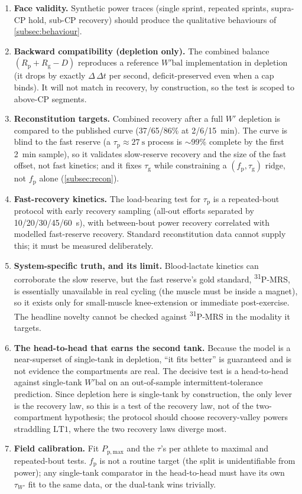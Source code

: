 \documentclass[11pt,a4paper]{article}
\newcommand{\Wp}{\ensuremath{W'}}
\newcommand{\Wbal}{\ensuremath{W'\!\text{bal}}}
\newcommand{\CP}{\ensuremath{\mathrm{CP}}}
\newcommand{\LTone}{\ensuremath{\mathrm{LT1}}}
\newcommand{\fp}{\ensuremath{f_{\mathrm p}}}
\newcommand{\Rp}{\ensuremath{R_{\mathrm p}}}
\newcommand{\Rg}{\ensuremath{R_{\mathrm g}}}
\newcommand{\Ppmax}{\ensuremath{P_{\mathrm{p,max}}}}
\newcommand{\taup}{\ensuremath{\tau_{\mathrm p}}}
\newcommand{\taug}{\ensuremath{\tau_{\mathrm g}}}
\newcommand{\tauW}{\ensuremath{\tau_{W'}}}
\newcommand{\degC}{\textsuperscript{31}P-MRS}
\begin{document}
\begin{enumerate}[leftmargin=1.6em,itemsep=3pt,label=\textbf{\arabic*.}]
\item \textbf{Face validity.}\label{item:face} Synthetic power traces (single sprint, repeated sprints,
supra-\CP{} hold, sub-\CP{} recovery) should produce the qualitative behaviours of \cref{subsec:behaviour}.
\item \textbf{Backward compatibility (depletion only).}\label{item:backcompat} The combined balance
$(\Rp+\Rg-D)$ reproduces a reference \Wbal{} implementation in depletion (it drops by exactly
$\Delta\,\Delta t$ per second, deficit-preserved even when a cap binds). It will not match in recovery, by
construction, so the test is scoped to above-\CP{} segments.
\item \textbf{Reconstitution targets.}\label{item:recon} Combined recovery after a full \Wp{} depletion is
compared to the published curve (37/65/86\% at 2/6/15~min\citep{Ferguson2010}). The curve is blind to the
fast reserve (a $\taup \approx 27~\mathrm{s}$ process is $\sim$99\% complete by the first 2~min sample), so
it validates slow-reserve recovery and the size of the fast offset, not fast kinetics; and it fixes \taug{}
while constraining a $(\fp,\taug)$ ridge, not \fp{} alone (\cref{subsec:recon}).
\item \textbf{Fast-recovery kinetics.}\label{item:fastrecov} The load-bearing test for \taup{} is a
repeated-bout protocol with early recovery sampling (all-out efforts separated by 10/20/30/45/60~s), with
between-bout power recovery correlated with modelled fast-reserve recovery.\citep{Bogdanis1996} Standard
reconstitution data cannot supply this; it must be measured deliberately.
\item \textbf{System-specific truth, and its limit.}\label{item:31p} Blood-lactate kinetics can corroborate
the slow reserve, but the fast reserve's gold standard, \degC, is essentially unavailable in real cycling
(the muscle must be inside a magnet), so it exists only for small-muscle knee-extension or immediate
post-exercise. The headline novelty cannot be checked against \degC{} in the modality it targets.
\item \textbf{The head-to-head that earns the second tank.}\label{item:headtohead} Because the model is a
near-superset of single-tank in depletion, ``it fits better'' is guaranteed and is not evidence the
compartments are real. The decisive test is a head-to-head against single-tank \Wbal{} on an out-of-sample
intermittent-tolerance prediction.\citep{Weigend2021} Since depletion here is single-tank by construction,
the only lever is the recovery law, so this is a test of the recovery law, not of the two-compartment
hypothesis; the protocol should choose recovery-valley powers straddling \LTone, where the two recovery
laws diverge most.
\item \textbf{Field calibration.}\label{item:field} Fit \Ppmax{} and the $\tau$'s per athlete to maximal
and repeated-bout tests. \fp{} is not a routine target (the split is unidentifiable from power); any
single-tank comparator in the head-to-head must have its own \tauW{} fit to the same data, or the dual-tank
wins trivially.
\end{enumerate}
\end{document}
